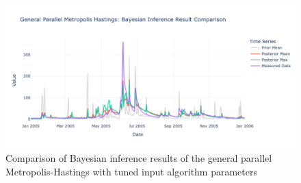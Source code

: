 \begin{figure}[H]
    \centering
    \includegraphics[width=.8\textwidth]{figures/gpmh/inferred.png}
    \captionsetup{width=.8\textwidth}
    \caption{Comparison of Bayesian inference results of the general parallel Metropolis-Hastings with tuned input algorithm parameters}
    \label{fig:enter-label}
\end{figure}